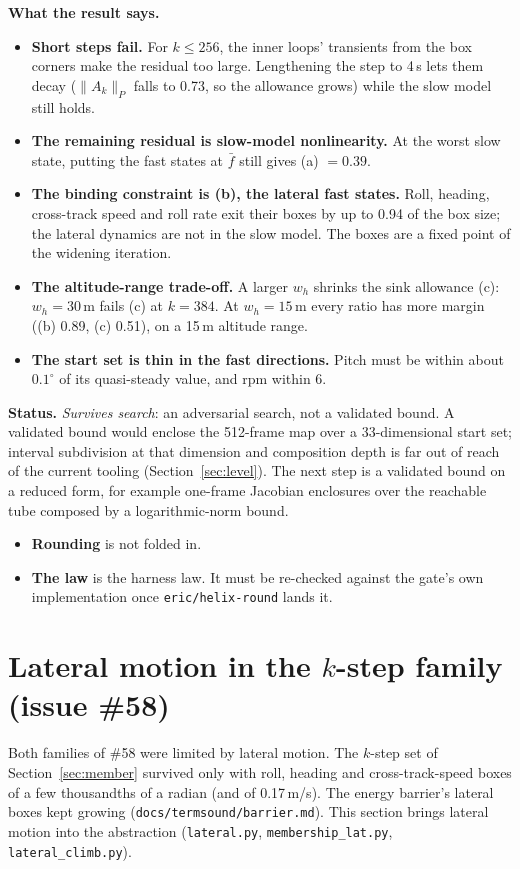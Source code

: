 \documentclass[11pt]{article}
\begin{document}
\textbf{What the result says.}
\begin{itemize}
\item \textbf{Short steps fail.} For $k \le 256$, the inner loops' transients from the box corners make the residual too large. Lengthening the step to 4\,s lets them decay ($\|A_k\|_P$ falls to 0.73, so the allowance grows) while the slow model still holds.
\item \textbf{The remaining residual is slow-model nonlinearity.} At the worst slow state, putting the fast states at $\bar f$ still gives (a) $= 0.39$.
\item \textbf{The binding constraint is (b), the lateral fast states.} Roll, heading, cross-track speed and roll rate exit their boxes by up to 0.94 of the box size; the lateral dynamics are not in the slow model. The boxes are a fixed point of the widening iteration.
\item \textbf{The altitude-range trade-off.} A larger $w_h$ shrinks the sink allowance (c): $w_h = 30$\,m fails (c) at $k = 384$. At $w_h = 15$\,m every ratio has more margin ((b) 0.89, (c) 0.51), on a 15\,m altitude range.
\item \textbf{The start set is thin in the fast directions.} Pitch must be within about $0.1^\circ$ of its quasi-steady value, and rpm within 6.
\end{itemize}

\textbf{Status.} \emph{Survives search}: an adversarial search, not a validated bound. A validated bound would enclose the 512-frame map over a 33-dimensional start set; interval subdivision at that dimension and composition depth is far out of reach of the current tooling (Section~\ref{sec:level}). The next step is a validated bound on a reduced form, for example one-frame Jacobian enclosures over the reachable tube composed by a logarithmic-norm bound.
\begin{itemize}
\item \textbf{Rounding} is not folded in.
\item \textbf{The law} is the harness law. It must be re-checked against the gate's own implementation once \texttt{eric/helix-round} lands it.
\end{itemize}


\section{Lateral motion in the $k$-step family (issue \#58)}\label{sec:lateral}

Both families of \#58 were limited by lateral motion. The $k$-step set of Section~\ref{sec:member} survived only with roll, heading and cross-track-speed boxes of a few thousandths of a radian (and of 0.17\,m/s). The energy barrier's lateral boxes kept growing (\texttt{docs/termsound/barrier.md}). This section brings lateral motion into the abstraction (\texttt{lateral.py}, \texttt{membership\_lat.py}, \texttt{lateral\_climb.py}).
\end{document}

